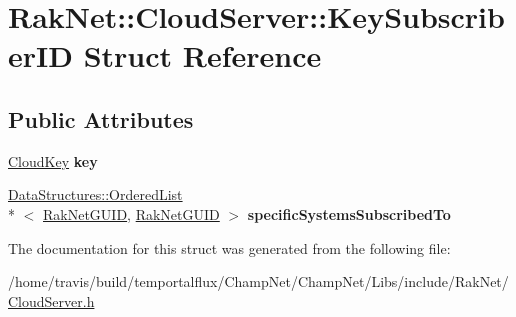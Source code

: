 \hypertarget{struct_rak_net_1_1_cloud_server_1_1_key_subscriber_i_d}{\section{Rak\-Net\-:\-:Cloud\-Server\-:\-:Key\-Subscriber\-I\-D Struct Reference}
\label{struct_rak_net_1_1_cloud_server_1_1_key_subscriber_i_d}
}
\subsection*{Public Attributes}
\begin{DoxyCompactItemize}
\item 
\hypertarget{struct_rak_net_1_1_cloud_server_1_1_key_subscriber_i_d_a4cfd06d78e49a0b7d7b875fb33aac57a}{\hyperlink{struct_rak_net_1_1_cloud_key}{Cloud\-Key} {\bfseries key}}\label{struct_rak_net_1_1_cloud_server_1_1_key_subscriber_i_d_a4cfd06d78e49a0b7d7b875fb33aac57a}

\item 
\hypertarget{struct_rak_net_1_1_cloud_server_1_1_key_subscriber_i_d_a0450950a7d2f77a3f01252b01437a80d}{\hyperlink{class_data_structures_1_1_ordered_list}{Data\-Structures\-::\-Ordered\-List}\\*
$<$ \hyperlink{struct_rak_net_1_1_rak_net_g_u_i_d}{Rak\-Net\-G\-U\-I\-D}, \hyperlink{struct_rak_net_1_1_rak_net_g_u_i_d}{Rak\-Net\-G\-U\-I\-D} $>$ {\bfseries specific\-Systems\-Subscribed\-To}}\label{struct_rak_net_1_1_cloud_server_1_1_key_subscriber_i_d_a0450950a7d2f77a3f01252b01437a80d}

\end{DoxyCompactItemize}


The documentation for this struct was generated from the following file\-:\begin{DoxyCompactItemize}
\item 
/home/travis/build/temportalflux/\-Champ\-Net/\-Champ\-Net/\-Libs/include/\-Rak\-Net/\hyperlink{_cloud_server_8h}{Cloud\-Server.\-h}\end{DoxyCompactItemize}
